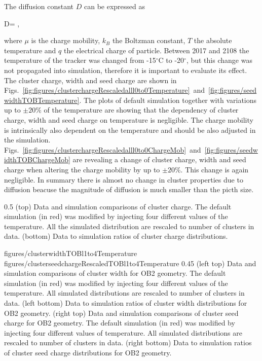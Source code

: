 The diffusion constant $D$ can be expressed as

{
   D=  ,
}

where $\mu$ is the charge mobility, $k_{B}$ the Boltzman constant, $T$ the absolute temperature and $q$ the electrical charge of particle. Between 2017 and 2108 the temperature of the tracker was changed from -15$^{\circ}$C to -20$^{\circ}$, but this change was not propagated into simulation, therefore it is important to evaluate its effect. The cluster charge, width and seed charge are shown in Figs.~\ref{fig:figures/clusterchargeRescaledalll0to0Temperature}~and~\ref{fig:figures/seedwidthTOBTemperature}. The plots of default simulation together with variations up to $\pm 20\%$ of the temperature are showing that the dependency of cluster charge, width and seed charge on temperature is negligible. The charge mobility is intrinsically also dependent on the temperature and should be also adjusted in the simulation. Figs.~\ref{fig:figures/clusterchargeRescaledalll0to0ChargeMob}~and~\ref{fig:figures/seedwidthTOBChargeMob} are revealing a change of cluster charge, width and seed charge when altering the charge mobility by up to $\pm 20\%$. This change is again negligible. In summary there is almost no change in cluster properties due to diffusion beacuse the magnitude of diffusion is much smaller than the picth size.


                 {0.5}       %
                 { (top) Data and simulation comparisons of cluster charge. The default simulation (in red) was modified by injecting four different values of the temperature. All the simulated distribution are rescaled to number of clusters in data. (bottom) Data to simulation ratios of cluster charge distributions. }

                 {figures/clusterwidthTOBl1to4Temperature}
                 {figures/clusterseedchargeRescaledTOBl1to4Temperature} %
                 {0.45}       %
                 {(left top) Data and simulation  comparisons of cluster width for OB2 geometry. The default simulation (in red) was modified by injecting four different values of the temperature. All simulated distributions are rescaled to number of clusters in data. (left bottom) Data to simulation ratios of cluster width distributions for OB2 geometry. (right top) Data and simulation  comparisons of cluster seed charge for OB2 geometry. The default simulation (in red) was modified by injecting four different values of temperature. All simulated distributions are rescaled to number of clusters in data. (right bottom) Data to simulation ratios of cluster seed charge distributions for OB2 geometry. }

